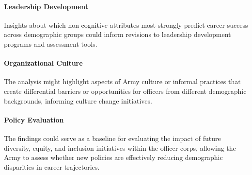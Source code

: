 \documentclass[../main.tex]{subfiles}
\begin{document}
\paragraph{Leadership Development} Insights about which non-cognitive attributes most strongly predict career success across demographic groups could inform revisions to leadership development programs and assessment tools.

\paragraph{Organizational Culture} The analysis might highlight aspects of Army culture or informal practices that create differential barriers or opportunities for officers from different demographic backgrounds, informing culture change initiatives.

\paragraph{Policy Evaluation} The findings could serve as a baseline for evaluating the impact of future diversity, equity, and inclusion initiatives within the officer corps, allowing the Army to assess whether new policies are effectively reducing demographic disparities in career trajectories.



\end{document}

